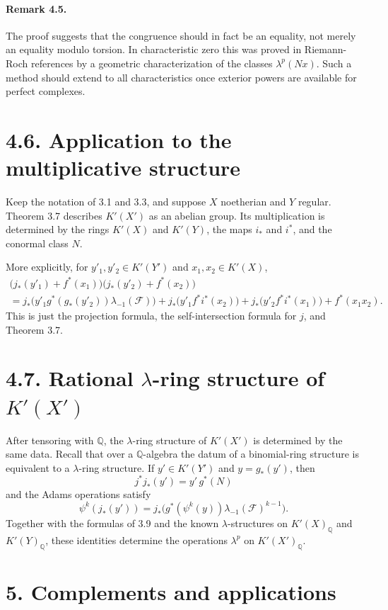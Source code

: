 \documentclass[12pt]{article}
\newcommand{\QQ}{\mathbb Q}
\newcommand{\uF}{\mathcal F}
\begin{document}
\paragraph{Remark 4.5.} The proof suggests that the congruence should in fact be an equality, not merely an equality modulo torsion. In characteristic zero this was proved in Riemann-Roch references by a geometric characterization of the classes $\lambda^p(Nx)$. Such a method should extend to all characteristics once exterior powers are available for perfect complexes.

\section*{4.6. Application to the multiplicative structure}

Keep the notation of 3.1 and 3.3, and suppose $X$ noetherian and $Y$ regular. Theorem 3.7 describes $K'(X')$ as an abelian group. Its multiplication is determined by the rings $K'(X)$ and $K'(Y)$, the maps $i_*$ and $i^*$, and the conormal class $N$.

More explicitly, for $y'_1,y'_2\in K'(Y')$ and $x_1,x_2\in K'(X)$,
\begin{multline*}
\bigl(j_*(y'_1)+f^*(x_1)\bigr)\bigl(j_*(y'_2)+f^*(x_2)\bigr)\\
= j_*\bigl(y'_1g^*(g_*(y'_2))\lambda_{-1}(\uF)\bigr)
+j_*\bigl(y'_1f^*i^*(x_2)\bigr)+j_*\bigl(y'_2f^*i^*(x_1)\bigr)+f^*(x_1x_2).
\end{multline*}
This is just the projection formula, the self-intersection formula for $j$, and Theorem 3.7.

\section*{4.7. Rational $\lambda$-ring structure of $K'(X')$}

After tensoring with $\QQ$, the $\lambda$-ring structure of $K'(X')$ is determined by the same data. Recall that over a $\QQ$-algebra the datum of a binomial-ring structure is equivalent to a $\lambda$-ring structure. If $y'\in K'(Y')$ and $y=g_*(y')$, then
\[
j^*j_*(y')=y'\,g^*(N)
\]
and the Adams operations satisfy
\[
\psi^k(j_*(y'))=j_*\bigl(g^*(\psi^k(y))\lambda_{-1}(\uF)^{k-1}\bigr).
\]
Together with the formulas of 3.9 and the known $\lambda$-structures on $K'(X)_\QQ$ and $K'(Y)_\QQ$, these identities determine the operations $\lambda^p$ on $K'(X')_\QQ$.

\section*{5. Complements and applications}
\end{document}
